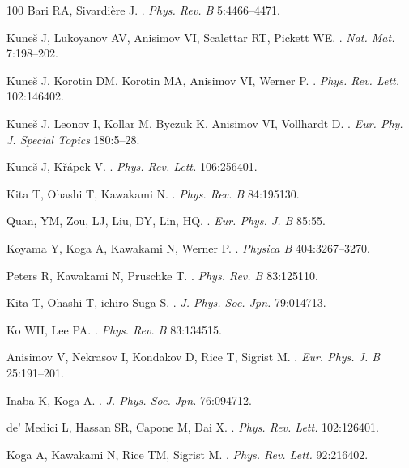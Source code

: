 \documentclass[]{ar2e-changed}%
\begin{document}
\begin{thebibliography}{100}
Bari RA, Sivardi\`ere J.
.
\newblock \emph{Phys. Rev. B} 5:4466--4471.

{Kune\v{s}} J, {Lukoyanov} AV, {Anisimov} VI, {Scalettar} RT, {Pickett} WE.
.
\newblock \emph{Nat. Mat.} 7:198--202.

Kune\v{s} J, Korotin DM, Korotin MA, Anisimov VI, Werner P.
.
\newblock \emph{Phys. Rev. Lett.} 102:146402.

{Kune\v{s}} J, {Leonov} I, {Kollar} M, {Byczuk} K, {Anisimov} VI, {Vollhardt}
  D.
.
\newblock \emph{Eur. Phy. J. Special Topics} 180:5--28.

Kune\v{s} J, K\v{r}\'apek V.
.
\newblock \emph{Phys. Rev. Lett.} 106:256401.

Kita T, Ohashi T, Kawakami N.
.
\newblock \emph{Phys. Rev. B} 84:195130.

{Quan, YM}, {Zou, LJ}, {Liu, DY}, {Lin, HQ}.
.
\newblock \emph{Eur. Phys. J. B} 85:55.

Koyama Y, Koga A, Kawakami N, Werner P.
.
\newblock \emph{Physica B} 404:3267--3270.

Peters R, Kawakami N, Pruschke T.
.
\newblock \emph{Phys. Rev. B} 83:125110.

Kita T, Ohashi T, ichiro Suga S.
.
\newblock \emph{J. Phys. Soc. Jpn.} 79:014713.

Ko WH, Lee PA.
.
\newblock \emph{Phys. Rev. B} 83:134515.

Anisimov V, Nekrasov I, Kondakov D, Rice T, Sigrist M.
.
\newblock \emph{Eur. Phys. J. B} 25:191--201.

Inaba K, Koga A.
.
\newblock \emph{J. Phys. Soc. Jpn.} 76:094712.

de' Medici L, Hassan SR, Capone M, Dai X.
.
\newblock \emph{Phys. Rev. Lett.} 102:126401.

Koga A, Kawakami N, Rice TM, Sigrist M.
.
\newblock \emph{Phys. Rev. Lett.} 92:216402.


\end{thebibliography}
\end{document}
